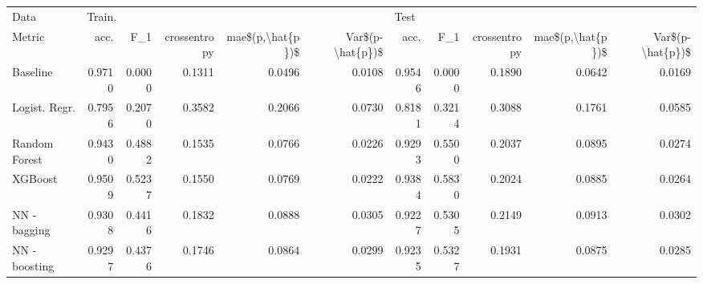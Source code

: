 \begin{tabular}{lrrrrrrrrrr}
\toprule
Data & \multicolumn{5}{l}{Train.} & \multicolumn{5}{l}{Test} \\
Metric &    acc. &     F\_1 & crossentropy & mae\$(p,\textbackslash hat\{p\})\$ & Var\$(p-\textbackslash hat\{p\})\$ &    acc. &     F\_1 & crossentropy & mae\$(p,\textbackslash hat\{p\})\$ & Var\$(p-\textbackslash hat\{p\})\$ \\
\midrule
Baseline      &  0.9710 &  0.0000 &       0.1311 &           0.0496 &           0.0108 &  0.9546 &  0.0000 &       0.1890 &           0.0642 &           0.0169 \\
Logist. Regr. &  0.7956 &  0.2070 &       0.3582 &           0.2066 &           0.0730 &  0.8181 &  0.3214 &       0.3088 &           0.1761 &           0.0585 \\
Random Forest &  0.9430 &  0.4882 &       0.1535 &           0.0766 &           0.0226 &  0.9293 &  0.5500 &       0.2037 &           0.0895 &           0.0274 \\
XGBoost       &  0.9509 &  0.5237 &       0.1550 &           0.0769 &           0.0222 &  0.9384 &  0.5830 &       0.2024 &           0.0885 &           0.0264 \\
NN - bagging  &  0.9308 &  0.4416 &       0.1832 &           0.0888 &           0.0305 &  0.9227 &  0.5305 &       0.2149 &           0.0913 &           0.0302 \\
NN - boosting &  0.9297 &  0.4376 &       0.1746 &           0.0864 &           0.0299 &  0.9235 &  0.5327 &       0.1931 &           0.0875 &           0.0285 \\
\bottomrule
\end{tabular}
